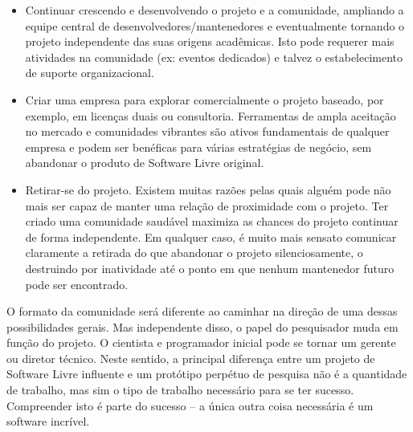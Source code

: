 %
\begin{itemize}
\item Continuar crescendo e desenvolvendo o projeto e a comunidade,
ampliando a equipe central de desenvolvedores/mantenedores e eventualmente tornando
o projeto independente das suas origens acadêmicas. Isto pode requerer mais
atividades na comunidade (ex: eventos dedicados) e talvez o estabelecimento de
suporte organizacional.
%
\item Criar uma empresa para explorar comercialmente o projeto baseado, por exemplo,
em licenças duais ou consultoria. Ferramentas de ampla aceitação no mercado e
comunidades vibrantes são ativos fundamentais de qualquer empresa e podem ser
benéficas para várias estratégias de negócio, sem abandonar o produto de Software
Livre original.
%
\item Retirar-se do projeto. Existem muitas razões pelas quais alguém pode não
mais ser capaz de manter uma relação de proximidade com o projeto. Ter criado
uma comunidade saudável maximiza as chances do projeto continuar de forma independente.
Em qualquer caso, é muito mais sensato comunicar claramente a retirada do que abandonar
o projeto silenciosamente, o destruindo por inatividade até o ponto em que nenhum
mantenedor futuro pode ser encontrado.
\end{itemize}
%
O formato da comunidade será diferente ao caminhar na direção de uma dessas possibilidades
gerais. Mas independente disso, o papel do pesquisador muda em função do projeto. O cientista
e programador inicial pode se tornar um gerente ou diretor técnico. Neste sentido, a principal
diferença entre um projeto de Software Livre influente e um protótipo perpétuo de pesquisa
não é a quantidade de trabalho, mas sim o tipo de trabalho necessário para se ter sucesso.
Compreender isto é parte do sucesso -- a única outra coisa necessária é um software incrível.
